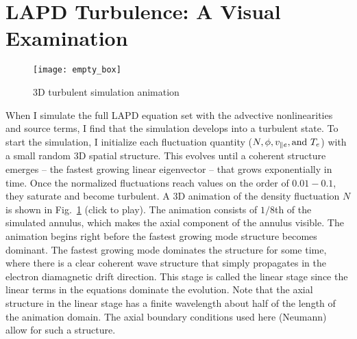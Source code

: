 \section{LAPD Turbulence: A Visual Examination}
\label{s_vis_exam}

\begin{figure}
\texttt{[image: empty\_box]}
\centering
\caption{3D turbulent simulation animation}
\label{3D_turb_anim}
\end{figure}


When I simulate the full LAPD equation set with the advective nonlinearities and source terms, I find that the simulation develops into a turbulent state. To start the simulation,
I initialize each fluctuation quantity ($N, \phi, v_{\parallel e}, {\rm and } \ T_e$) with a small random 3D spatial structure. This evolves until a coherent structure emerges -- the fastest
growing linear eigenvector -- that grows exponentially in time. Once the normalized fluctuations reach values on the order of $0.01-0.1$, they saturate and become turbulent.
A 3D animation of the density fluctuation $N$ is shown in Fig.~\ref{3D_turb_anim} (click to play). 
The animation consists of $1/8$th of the simulated annulus, which makes the axial component of the annulus visible.
The animation begins right before the fastest growing mode structure becomes dominant. The fastest growing mode dominates the structure for some time, where there is a clear coherent
wave structure that simply propagates in the electron diamagnetic drift direction. This stage is called the linear stage since the linear terms in the equations dominate the evolution.
Note that the axial structure in the linear stage has a finite wavelength about half of the length of the animation domain. The axial boundary conditions used here (Neumann) allow for
such a structure.

